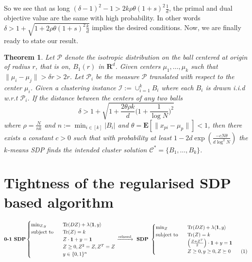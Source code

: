 \documentclass[12pt]{article}
\newcommand{\mc}{\mathcal}
\newcommand{\mb}{\mathbf}
\newcommand{\tr}{\text{Tr}}
\newcommand\numberthis{\addtocounter{equation}{1}\tag{\theequation}}
\newtheorem{theorem}{Theorem}
\begin{document}
So we see that as long $(\delta - 1)^2 - 1 > 2k\rho\theta (1+s)^2\frac{1}{d}$, the primal and dual objective value are the same with high probability. In other words $\delta > 1 + \sqrt{1+2\rho\theta(1+s)^2\frac{k}{d}}$ implies the desired conditions. Now, we are finally ready to state our result.

\begin{theorem}
\label{a-thm:SDPIsometric}
Let $\mc P$ denote the isotropic distribution on the ball centered at origin of radius $r$, that is on, $B_1(r)$ in $\mb R^d$. Given centers $\mu_1, \ldots, \mu_k$ such that $\|\mu_i - \mu_j\| > \delta r > 2 r$. Let $\mc P_i$ be the measure $\mc P$ translated with respect to the center $\mu_i$. Given a clustering instance $\mc I := \cup_{i=1}^k B_i$ where each $B_i$ is drawn i.i.d w.r.t $\mc P_i$. If the distance between the centers of any two balls
$$\delta > 1 + \sqrt{1+\frac{2\theta\rho k}{d}\Big(1+\frac{1}{\log N}\Big)^2}$$  
where $\rho = \frac{N}{nk}$ and $ n := \min_{i\in[k]} |B_i|$ and $\theta = \mb E[\|x_{pi}-\mu_p\|] < 1$, then there exists a constant $c > 0$ such that with probability at least $1 - 2d\exp(\frac{-cN\theta}{d\log^2N})$ the $k$-means SDP finds the intended cluster solution  $\mc C^* = \{B_1, \ldots, B_k\}$.
\end{theorem}

\section{Tightness of the regularised SDP based algorithm}
\begin{equation*}
	\textbf{0-1 SDP} 
	\begin{cases}
		\min_{Z, y} \enspace &\tr(DZ) + \lambda \langle \mb 1, y\rangle\\
		\text{subject to } \enspace &\tr(Z) = k\\
		& Z\cdot \mb 1 + y = \mb 1\\	
		&Z\ge 0, Z^2 = Z, Z^T = Z \\
		& y \in \{0, 1\}^n
	\end{cases}
	\xrightarrow{\text{relaxed}} \textbf{ SDP } 
	\begin{cases}
		\min_{Z} \enspace &\tr(DZ) + \lambda \langle \mb 1, y\rangle\\
        \text{subject to } \enspace &\tr(Z) = k\\
		& \Big(\frac{Z+Z^T}{2}\Big)\cdot \mb 1 + y = \mb 1\\		
		&Z \ge 0, y \ge 0, Z \succeq 0 \numberthis\label{a-eqn:regularisedSDP}
	\end{cases}
\end{equation*}
\end{document}
